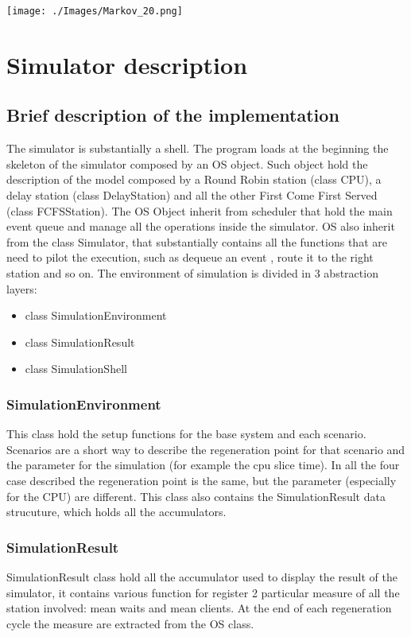 \documentclass[12pt,a4paper]{article}
\begin{document}
\texttt{[image: ./Images/Markov\_20.png]}


\section{Simulator description}
\subsection{Brief description of the implementation}
The simulator is substantially a shell. The program loads at the beginning the skeleton of the simulator composed by an OS object. Such object hold the description of the model composed by a Round Robin station (class CPU), a delay station (class DelayStation) and all the other First Come First Served (class FCFSStation). The OS Object inherit from scheduler that hold the main event queue and manage all the operations inside the simulator. OS also inherit from the class Simulator, that substantially contains all the functions that are need to pilot the execution, such as dequeue an event , route it to the right station and so on. The environment of simulation is divided in 3 abstraction layers:
\begin{itemize}
    \item class SimulationEnvironment
    \item class SimulationResult
    \item class SimulationShell
\end{itemize}
\subsubsection{SimulationEnvironment}
This class hold the setup functions for the base system and each scenario. Scenarios are a short way to describe the regeneration point for that scenario and the parameter for the simulation (for example the cpu slice time). In all the four case described the regeneration point is the same, but the parameter (especially for the CPU) are different. This class also contains the SimulationResult data strucuture, which holds all the accumulators.
\subsubsection{SimulationResult}
SimulationResult class hold all the accumulator used to display the result of the simulator, it contains various function for register 2 particular measure of all the station involved: mean waits and mean clients. At the end of each regeneration cycle the measure are extracted from the OS class.
\end{document}
